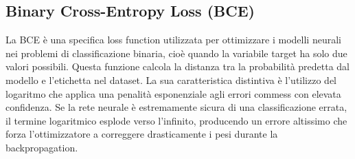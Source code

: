 \subsection{Binary Cross-Entropy Loss (BCE)}
La BCE è una specifica loss function utilizzata per ottimizzare i modelli neurali nei problemi di classificazione binaria, cioè quando la variabile target ha solo due valori possibili.
Questa funzione calcola la distanza tra la probabilità predetta dal modello e l'etichetta nel dataset.
La sua caratteristica distintiva è l'utilizzo del logaritmo che applica una penalità esponenziale agli errori commess con elevata confidenza.
Se la rete neurale è estremamente sicura di una classificazione errata, il termine logaritmico esplode verso l'infinito, producendo un errore altissimo che forza l'ottimizzatore a correggere drasticamente i pesi durante la backpropagation.


